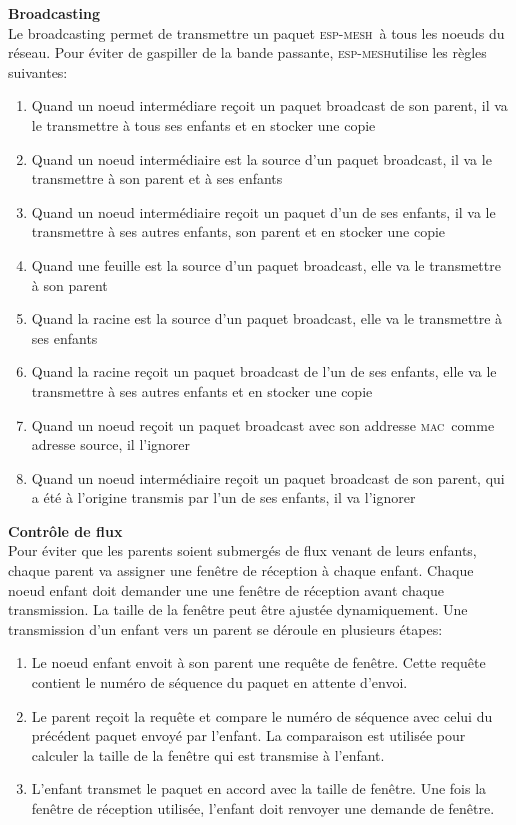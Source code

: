 \documentclass[a4paper, 12pt]{report}
\newcommand{\espmesh}{\textsc{esp-mesh}}
\newcommand{\mac}{\textsc{mac}}
\begin{document}
    \vspace{0.5cm}
    \textbf{Broadcasting}\\
        Le broadcasting permet de transmettre un paquet \espmesh\ à tous les noeuds du réseau. Pour éviter de gaspiller de
        la bande passante, \espmesh utilise les règles suivantes:
        \begin{enumerate}
            \item Quand un noeud intermédiare reçoit un paquet broadcast de son parent, il va le transmettre à tous ses enfants
                et en stocker une copie
            \item Quand un noeud intermédiaire est la source d'un paquet broadcast, il va le transmettre à son parent et à ses enfants
            \item Quand un noeud intermédiaire reçoit un paquet d'un de ses enfants, il va le transmettre à ses autres enfants, son parent
                et en stocker une copie
            \item Quand une feuille est la source d'un paquet broadcast, elle va le transmettre à son parent
            \item Quand la racine est la source d'un paquet broadcast, elle va le transmettre à ses enfants
            \item Quand la racine reçoit un paquet broadcast de l'un de ses enfants, elle va le transmettre à ses autres enfants et en stocker une copie
            \item Quand un noeud reçoit un paquet broadcast avec son addresse \mac\ comme adresse source, il l'ignorer
            \item Quand un noeud intermédiaire reçoit un paquet broadcast de son parent, qui a été à l'origine transmis par l'un de ses enfants, il va l'ignorer
        \end{enumerate}
    \vspace{0.5cm}
    \textbf{Contrôle de flux}\\
        Pour éviter que les parents soient submergés de flux venant de leurs enfants, chaque parent va
        assigner une fenêtre de réception à chaque enfant. Chaque noeud enfant doit demander une une fenêtre
        de réception avant chaque transmission. La taille de la fenêtre peut être ajustée dynamiquement.
        Une transmission d'un enfant vers un parent se déroule en plusieurs étapes:
        \begin{enumerate}
            \item Le noeud enfant envoit à son parent une requête de fenêtre. Cette requête contient le numéro de séquence du paquet en attente d'envoi.
            \item Le parent reçoit la requête et compare le numéro de séquence avec celui du précédent paquet envoyé par l'enfant.
                La comparaison est utilisée pour calculer la taille de la fenêtre qui est transmise à l'enfant.
            \item L'enfant transmet le paquet en accord avec la taille de fenêtre. Une fois la fenêtre de réception utilisée, l'enfant doit renvoyer une demande de fenêtre.
        \end{enumerate}
\end{document}
